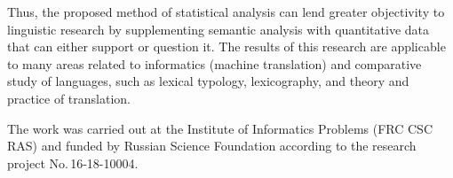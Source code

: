\begin{multicols}{2}
{}
  
  Thus, the proposed method of statistical analysis can lend greater objectivity to 
linguistic research by supplementing semantic analysis with quantitative data that can 
either support or question it. The results of this research are applicable to many areas 
related to informatics (machine translation) and comparative study of languages, such 
as lexical typology, lexicography, and theory and practice of translation.

\vspace*{-12pt}

\Ack
  \noindent
   The work was carried out at the Institute of Informatics Problems (FRC CSC RAS) and funded by Russian 
Science Foundation according to the research project No.\,16-18-10004.
  
 \renewcommand{\bibname}{\protect\rmfamily References}


\vspace*{-6pt}

{\small\frenchspacing
{\baselineskip=10.65pt
\begin{thebibliography}{99}


\end{thebibliography}}}
\end{multicols}
